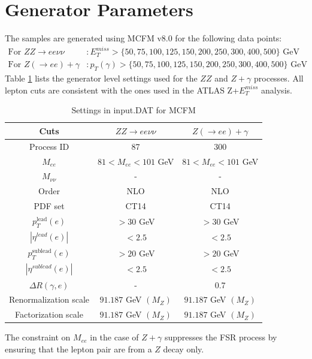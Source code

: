 \documentclass[11pt,a4paper]{report}
\begin{document}
\section{Generator Parameters}
The samples are generated using MCFM v8.0 for the following data points:
\begin{align*}
	\text{For } ZZ \rightarrow ee\nu\nu &: E_T^{miss} > \{50,75,100,125,150,200,250,300,400,500\}\text{ GeV} \\
	\text{For } Z(\rightarrow ee)+\gamma &: p_T(\gamma) > \{50,75,100,125,150,200,250,300,400,500\}\text{ GeV}
\end{align*}
Table \ref{table:default} lists the generator level settings used for the $ZZ$ and $Z+\gamma$ processes. All lepton cuts are consistent with the ones used in the ATLAS Z+$E_T^{miss}$ analysis.
\begin{table}[H]
\begin{center}
	\begin{tabular}{|c|c|c|}
	\hline
	\textbf{Cuts} &$ZZ \rightarrow ee\nu\nu$ & $Z(\rightarrow ee)+\gamma$\\
	\hline
	Process ID & 87 & 300\\
	$M_{ee}$ & $81 < M_{ee} < 101$ GeV & $81 < M_{ee} < 101$ GeV\\
	$M_{\nu\nu}$ & - & -\\
	Order & NLO & NLO\\
	PDF set & CT14 & CT14\\
	$p_T^{\text{lead}}(e)$ & $> 30$ GeV & $> 30$ GeV\\
	$|\eta^{lead}(e)|$ & $< 2.5$ & $< 2.5$\\
	$p_T^{\text{sublead}}(e)$ & $> 20$ GeV & $> 20$ GeV\\
	$|\eta^{sublead}(e)|$ & $< 2.5$ & $< 2.5$\\
	$\Delta R(\gamma,e)$ & - & 0.7\\
	Renormalization scale & $91.187$ GeV $(M_{Z})$& $91.187$ GeV $(M_{Z})$\\
	Factorization scale & $91.187$ GeV $(M_{Z})$& $91.187$ GeV $(M_{Z})$\\
	\hline
	\end{tabular}
	\caption{Settings in input.DAT for MCFM}
	\label{table:default}
	\end{center}
\end{table}
The constraint on $M_{ee}$ in the case of $Z+\gamma$ suppresses the FSR process by ensuring that the lepton pair are from a $Z$ decay only.
\end{document}
